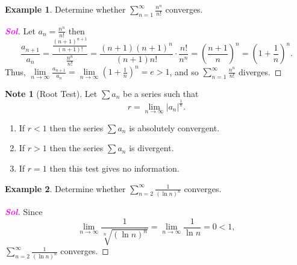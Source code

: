 \documentclass[12pt,openany]{book}
\theoremstyle{definition}
\newtheorem*{note}{Note}
\newtheorem{example}{Example}[section]
\newcommand{\of}[1]{\left( #1 \right)}
\newcommand{\abs}[1]{\left\lvert #1 \right\rvert}
\newcommand{\sol}{\textcolor{magenta}{\bf Sol}}
\begin{document}
	\vspace{4pt}
	\begin{example}
		Determine whether $\sum_{n=1}^\infty\frac{n^n}{n!}$ converges.
		\begin{proof}[\sol]
			Let $a_n=\frac{n^n}{n!}$ then \[
			\frac{a_{n+1}}{a_n}=\frac{\frac{\of{n+1}^{n+1}}{\of{n+1}!}}{\frac{n^n}{n!}}=\frac{(n+1)(n+1)^n}{(n+1)n!}\cdot\frac{n!}{n^n}=\of{\frac{n+1}{n}}^n=\of{1+\frac{1}{n}}^n.
			\] Thus, $\lim\limits_{n\to\infty}\frac{a_{n+1}}{a_n}=\lim\limits_{n\to\infty}\of{1+\frac{1}{n}}^n=e>1$, and so $\sum_{n=1}^\infty\frac{n^n}{n!}$ diverges.
		\end{proof}
	\end{example}
	\vspace{8pt}
	\begin{note}[Root Test]
		Let $\sum a_n$ be a series such that \[
		r=\lim\limits_{n\to\infty}\abs{a_n}^{\frac{1}{n}}.
		\]\begin{enumerate}
			\item If $r<1$ then the series $\sum a_n$ is absolutely convergent.
			\item If $r>1$ then the series $\sum a_n$ is divergent.
			\item If $r=1$ then this test gives no information.
		\end{enumerate}
	\end{note}
	\vspace{4pt}
	\begin{example}
		Determine whether $\sum_{n=2}^\infty\frac{1}{\of{\ln n}^n}$ converges.
		\begin{proof}[\sol]
			Since \[
			\lim\limits_{n\to\infty}\frac{1}{\sqrt[n]{\of{\ln n}^n}}=\lim\limits_{n\to\infty}\frac{1}{\ln n}=0<1,
			\] $\sum_{n=2}^\infty\frac{1}{\of{\ln n}^n}$ converges.
		\end{proof}
	\end{example}
	
	
\end{document}

